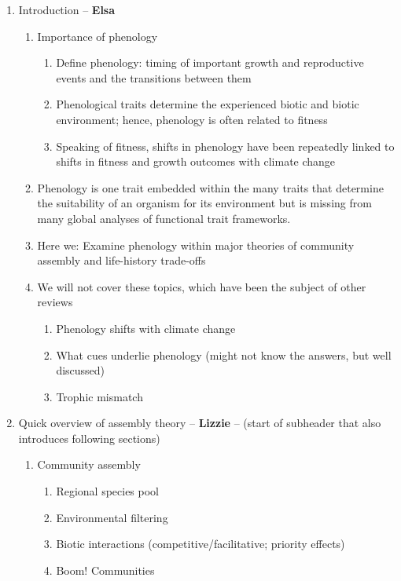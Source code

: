 \documentclass[11pt]{article}
\begin{document}
\begin{enumerate}
\item Introduction -- {\bf Elsa}
\begin{enumerate}
\item Importance of phenology  
\begin{enumerate}
\item Define phenology: timing of important growth and reproductive events and the transitions between them
\item Phenological traits determine the experienced biotic and biotic environment; hence, phenology is often related to fitness
\item Speaking of fitness, shifts in phenology have been repeatedly linked to shifts in fitness and growth outcomes with climate change \citep{Cleland:2012}
\end{enumerate}
\item Phenology is one trait embedded within the many traits that determine the suitability of an organism for its environment but is missing from many global analyses of functional trait frameworks.
\item Here we: Examine phenology within major theories of community assembly and life-history trade-offs
\item We will not cover these topics, which have been the subject of other reviews %
\begin{enumerate}
\item Phenology shifts with climate change \citep{menzel2020}
\item What cues underlie phenology (might not know the answers, but well discussed) \citep{chuinearees}
\item Trophic mismatch \citep{kharouba2018}
\end{enumerate}
\end{enumerate}
\item Quick overview of assembly theory  -- {\bf Lizzie} --  (start of subheader that also introduces following sections)
\begin{enumerate}
\item Community assembly
\begin{enumerate}
\item Regional species pool
\item Environmental filtering
\item Biotic interactions (competitive/facilitative; priority effects)
\item Boom! Communities
\end{enumerate}

\end{enumerate}
\end{enumerate}
\end{document}
